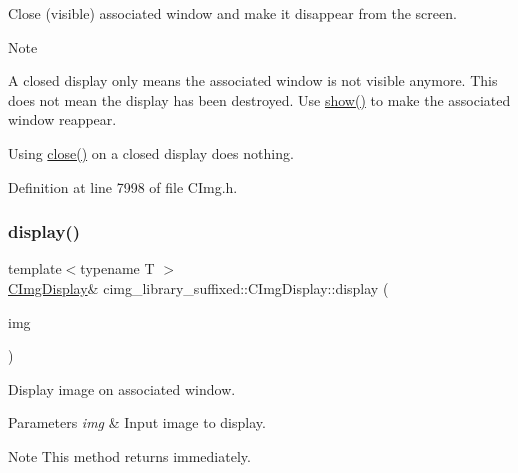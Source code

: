 Close (visible) associated window and make it disappear from the screen. 

\begin{DoxyNote}{Note}

\begin{DoxyItemize}
\item A closed display only means the associated window is not visible anymore. This does not mean the display has been destroyed. Use \hyperlink{structcimg__library__suffixed_1_1CImgDisplay_a40569e73fec12daeec84942b0d0f1b6d}{show()} to make the associated window reappear.
\item Using \hyperlink{structcimg__library__suffixed_1_1CImgDisplay_ab8b103966af1d6ba45a410d1814e4000}{close()} on a closed display does nothing. 
\end{DoxyItemize}
\end{DoxyNote}


Definition at line 7998 of file C\+Img.\+h.

\mbox{\label{structcimg__library__suffixed_1_1CImgDisplay_ad08f2f8b85cdd55d5e3ea71bdebf2b67}} 
\subsubsection{\texorpdfstring{display()}{display()}\hspace{0.1cm}{\footnotesize\ttfamily [1/2]}}
{\footnotesize\ttfamily template$<$typename T $>$ \\
\hyperlink{structcimg__library__suffixed_1_1CImgDisplay}{C\+Img\+Display}\& cimg\+\_\+library\+\_\+suffixed\+::\+C\+Img\+Display\+::display (\begin{DoxyParamCaption}\item[{const \hyperlink{structcimg__library__suffixed_1_1CImg}{C\+Img}$<$ T $>$ \&}]{img }\end{DoxyParamCaption})\hspace{0.3cm}{\ttfamily [inline]}}



Display image on associated window. 


\begin{DoxyParams}{Parameters}
{\em img} & Input image to display. \\
\hline
\end{DoxyParams}
\begin{DoxyNote}{Note}
This method returns immediately. 
\end{DoxyNote}


